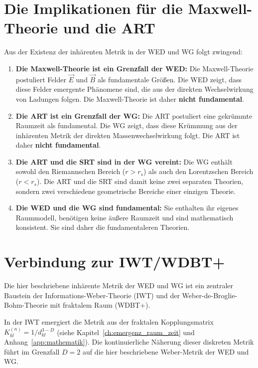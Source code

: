 \section{Die Implikationen für die Maxwell-Theorie und die ART}
\label{app:weber_metrik_maxwell_art}

Aus der Existenz der inhärenten Metrik in der WED und WG folgt zwingend:

\begin{enumerate}
    \item \textbf{Die Maxwell-Theorie ist ein Grenzfall der WED:} Die Maxwell-Theorie postuliert Felder \( \vec{E} \) und \( \vec{B} \) als fundamentale Größen. Die WED zeigt, dass diese Felder emergente Phänomene sind, die aus der direkten Wechselwirkung von Ladungen folgen. Die Maxwell-Theorie ist daher \textbf{nicht fundamental}.
    
    \item \textbf{Die ART ist ein Grenzfall der WG:} Die ART postuliert eine gekrümmte Raumzeit als fundamental. Die WG zeigt, dass diese Krümmung aus der inhärenten Metrik der direkten Massenwechselwirkung folgt. Die ART ist daher \textbf{nicht fundamental}.
    
    \item \textbf{Die ART und die SRT sind in der WG vereint:} Die WG enthält sowohl den Riemannschen Bereich (\( r > r_s \)) als auch den Lorentzschen Bereich (\( r < r_s \)). Die ART und die SRT sind damit keine zwei separaten Theorien, sondern zwei verschiedene geometrische Bereiche einer einzigen Theorie.
    
    \item \textbf{Die WED und die WG sind fundamental:} Sie enthalten ihr eigenes Raummodell, benötigen keine äußere Raumzeit und sind mathematisch konsistent. Sie sind daher die fundamentaleren Theorien.
\end{enumerate}

\section{Verbindung zur IWT/WDBT+}
\label{app:weber_metrik_wdbt}

Die hier beschriebene inhärente Metrik der WED und WG ist ein zentraler Baustein der Informations-Weber-Theorie (IWT) und der Weber-de-Broglie-Bohm-Theorie mit fraktalem Raum (WDBT+). 

In der IWT emergiert die Metrik aus der fraktalen Kopplungsmatrix \( K_{kl}^{(n)} = 1/d_{kl}^{3-D} \) (siehe Kapitel~\ref{ch:emergenz_raum_zeit} und Anhang~\ref{app:mathematik}). Die kontinuierliche Näherung dieser diskreten Metrik führt im Grenzfall \( D = 2 \) auf die hier beschriebene Weber-Metrik der WED und WG.

